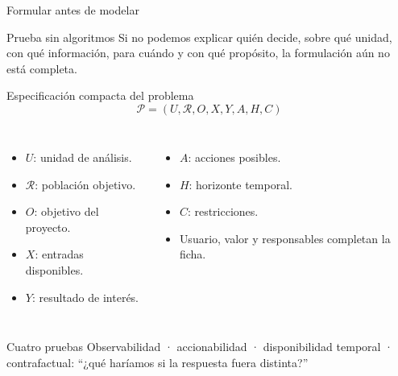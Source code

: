 \documentclass[aspectratio=169,11pt]{beamer}
\newcommand{\br}{\\}
\begin{document}
\begin{frame}{Formular antes de modelar}
  \centering
  \vspace{0.8em}
  \begin{block}{Prueba sin algoritmos}
    Si no podemos explicar quién decide, sobre qué unidad, con qué información, para cuándo y con qué propósito, la formulación aún no está completa.
  \end{block}
\end{frame}

\begin{frame}{Especificación compacta del problema}
  \[
    \mathcal P=(U,\mathcal R,O,X,Y,A,H,C)
  \]
  \small
  \begin{columns}[T]
      \begin{itemize}
        \item $U$: unidad de análisis.
        \item $\mathcal R$: población objetivo.
        \item $O$: objetivo del proyecto.
        \item $X$: entradas disponibles.
        \item $Y$: resultado de interés.
      \end{itemize}
      \begin{itemize}
        \item $A$: acciones posibles.
        \item $H$: horizonte temporal.
        \item $C$: restricciones.
        \item Usuario, valor y responsables completan la ficha.
      \end{itemize}
  \end{columns}
  \begin{block}{Cuatro pruebas}
    Observabilidad · accionabilidad · disponibilidad temporal · contrafactual: ``¿qué haríamos si la respuesta fuera distinta?''
  \end{block}
\end{frame}
\end{document}
